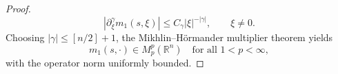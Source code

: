 \documentclass[10pt]{article}
\newtheorem{proposition}{Proposition}[section]
\newtheorem{lemma}{Lemma}[section]
\newcommand{\<}{\langle}
\renewcommand{\>}{\rangle}
\numberwithin{equation}{section}
\begin{document}
\begin{itemize}
\begin{proof}
\[ |\partial_\xi^\gamma m_1(s,\xi)| \leq   C_\gamma |\xi|^{-|\gamma|}, \qquad \xi\neq 0.\]
Choosing $|\gamma|\le [n/2]+1$, the Mikhlin--H\"{o}rmander multiplier theorem yields
\[ m_1(s,\cdot)\in M_p^p(\mathbb{R}^n) \quad\text{for all }1<p<\infty, \]
with the operator norm uniformly bounded.
\end{proof}
%


\end{itemize}
\end{document}
